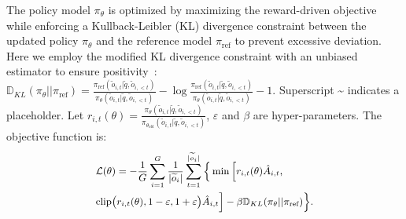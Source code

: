 \documentclass[11pt]{article}
\begin{document}
The policy model $\pi_\theta$ is optimized by maximizing the reward-driven objective while enforcing a Kullback-Leibler (KL) divergence constraint between the updated policy $\pi_\theta$ and the reference model $\pi_{\text{ref}}$ to prevent excessive deviation.
Here we employ the modified KL divergence constraint with an unbiased estimator to ensure positivity~\citep{shao2024deepseekmath}: $\mathbb{D}_{KL}(\pi_{\theta}||\pi_{\text{ref}}) =\frac{\pi_{\text{ref}}(\widetilde{o}_{i,t}|\widetilde{q},\widetilde{o}_{i,<t})}{\pi_{\theta}(\widetilde{o}_{i,t}|\widetilde{q},\widetilde{o}_{i,<t})} - \log \frac{\pi_{\text{ref}}(\widetilde{o}_{i,t}|\widetilde{q},\widetilde{o}_{i,<t})}{\pi_{\theta}(\widetilde{o}_{i,t}|\widetilde{q},\widetilde{o}_{i,<t})} - 1$. Superscript \~{} indicates a placeholder. Let $r_{i,t}(\theta) = \frac{\pi_{\theta}(\widetilde{o}_{i,t}|\widetilde{q},\widetilde{o}_{i,<t})}{\pi_{\theta_{\text{old}}}(\widetilde{o}_{i,t}|\widetilde{q},\widetilde{o}_{i,<t})}$, $\varepsilon$ and $\beta$ are hyper-parameters. The objective function is:
\begin{equation}
\small
\begin{aligned}
& \mathcal{L}(\theta) =  - \frac{1}{G} \sum_{i = 1}^{G} \frac{1}{|\widetilde{o}_{i}|} \sum_{t = 1}^{|\widetilde{o}_{i}|} \Big\{\min \Big[r_{i,t}(\theta) \hat{A}_{i,t}, \\
& \mathrm{clip} \big(r_{i,t}(\theta), 1 - \varepsilon, 1 + \varepsilon\big) \hat{A}_{i,t}\Big] - \beta \mathbb{D}_{KL}(\pi_{\theta}||\pi_{\text{ref}}) \Big\}.
\end{aligned}
\end{equation}%




\end{document}
